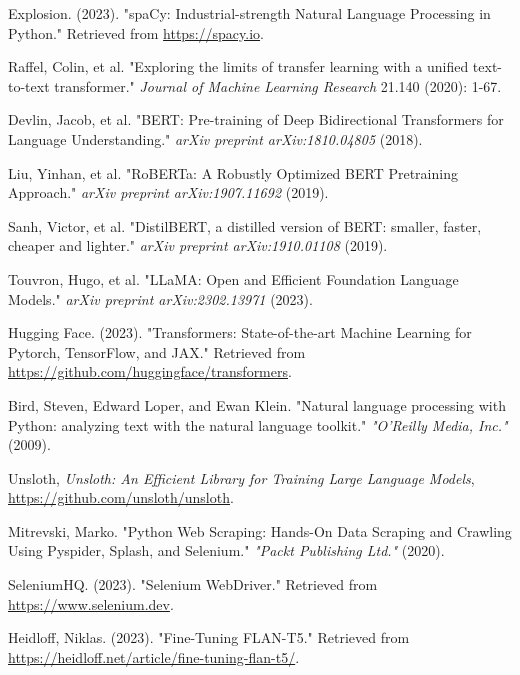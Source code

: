 \documentclass[conference]{IEEEtran}
\begin{document}
\begin{thebibliography}{1}
        Explosion. (2023). "spaCy: Industrial-strength Natural Language Processing in Python." Retrieved from \url{https://spacy.io}.

        Raffel, Colin, et al. "Exploring the limits of transfer learning with a unified text-to-text transformer." \emph{Journal of Machine Learning Research} 21.140 (2020): 1-67.

        Devlin, Jacob, et al. "BERT: Pre-training of Deep Bidirectional Transformers for Language Understanding." \emph{arXiv preprint arXiv:1810.04805} (2018).

        Liu, Yinhan, et al. "RoBERTa: A Robustly Optimized BERT Pretraining Approach." \emph{arXiv preprint arXiv:1907.11692} (2019).

        Sanh, Victor, et al. "DistilBERT, a distilled version of BERT: smaller, faster, cheaper and lighter." \emph{arXiv preprint arXiv:1910.01108} (2019).

        Touvron, Hugo, et al. "LLaMA: Open and Efficient Foundation Language Models." \emph{arXiv preprint arXiv:2302.13971} (2023).

        Hugging Face. (2023). "Transformers: State-of-the-art Machine Learning for Pytorch, TensorFlow, and JAX." Retrieved from \url{https://github.com/huggingface/transformers}.

        Bird, Steven, Edward Loper, and Ewan Klein. "Natural language processing with Python: analyzing text with the natural language toolkit." \emph{"O'Reilly Media, Inc."} (2009).

        Unsloth, \emph{Unsloth: An Efficient Library for Training Large Language Models}, \href{https://github.com/unsloth/unsloth}{https://github.com/unsloth/unsloth}.

        Mitrevski, Marko. "Python Web Scraping: Hands-On Data Scraping and Crawling Using Pyspider, Splash, and Selenium." \emph{"Packt Publishing Ltd."} (2020).

        SeleniumHQ. (2023). "Selenium WebDriver." Retrieved from \url{https://www.selenium.dev}.

        Heidloff, Niklas. (2023). "Fine-Tuning FLAN-T5." Retrieved from \url{https://heidloff.net/article/fine-tuning-flan-t5/}.


\end{thebibliography}
\end{document}
